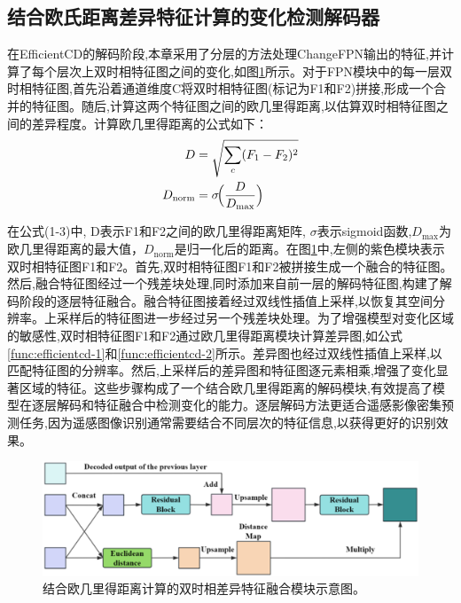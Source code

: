 \subsection{结合欧氏距离差异特征计算的变化检测解码器}

在EfficientCD的解码阶段,本章采用了分层的方法处理ChangeFPN输出的特征,并计算了每个层次上双时相特征图之间的变化,如图\ref{fig:efficientcd_euclidean}所示。对于FPN模块中的每一层双时相特征图,首先沿着通道维度C将双时相特征图(标记为F1和F2)拼接,形成一个合并的特征图。随后,计算这两个特征图之间的欧几里得距离,以估算双时相特征图之间的差异程度。计算欧几里得距离的公式如下：
\begin{align}
D &= \sqrt{\sum_{c}(F_{1} - F_{2})^{2}} \label{func:efficientcd-1} \\
D_{\mathrm{norm}} &= \sigma\!\Bigl(\frac{D}{D_{\max}}\Bigr) \label{func:efficientcd-2}
\end{align}


在公式(1-3)中, D表示F1和F2之间的欧几里得距离矩阵, $\sigma$表示sigmoid函数,${D_{\max}}$为欧几里得距离的最大值，$D_{\mathrm{norm}}$是归一化后的距离。在图\ref{fig:efficientcd_euclidean}中,左侧的紫色模块表示双时相特征图F1和F2。首先,双时相特征图F1和F2被拼接生成一个融合的特征图。然后,融合特征图经过一个残差块处理,同时添加来自前一层的解码特征图,构建了解码阶段的逐层特征融合。融合特征图接着经过双线性插值上采样,以恢复其空间分辨率。上采样后的特征图进一步经过另一个残差块处理。为了增强模型对变化区域的敏感性,双时相特征图F1和F2通过欧几里得距离模块计算差异图,如公式\ref{func:efficientcd-1}和\ref{func:efficientcd-2}所示。差异图也经过双线性插值上采样,以匹配特征图的分辨率。然后,上采样后的差异图和特征图逐元素相乘,增强了变化显著区域的特征。这些步骤构成了一个结合欧几里得距离的解码模块,有效提高了模型在逐层解码和特征融合中检测变化的能力。逐层解码方法更适合遥感影像密集预测任务,因为遥感图像识别通常需要结合不同层次的特征信息,以获得更好的识别效果。

\begin{figure}[!htbp]
  \centering
  \includegraphics[width=\textwidth]{paper_figures/基于双时相遥感影像特征交互的变化检测算法研究/EfficientCD/efficientcd_euclidean.png}
  \caption{结合欧几里得距离计算的双时相差异特征融合模块示意图。}
  \label{fig:efficientcd_euclidean}
\end{figure}

